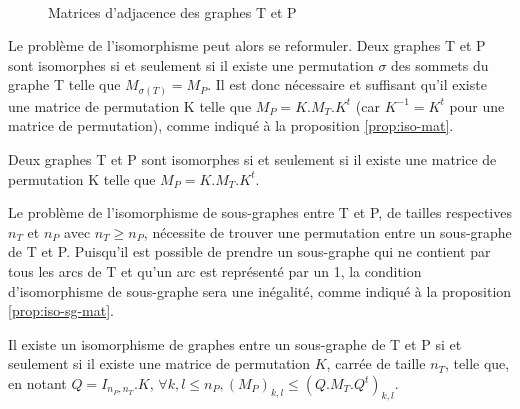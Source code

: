 \begin{figure}[ht]
\begin{center}
  \quad
  \\
\end{center}
\caption{Matrices d'adjacence des graphes T et P}
\label{fig:mat-adj}
\end{figure}

Le problème de l'isomorphisme peut alors se reformuler. Deux graphes T et P sont isomorphes si et seulement si il existe une permutation $\sigma$ des sommets du graphe T telle
que $M_{\sigma(T)}=M_P$. Il est donc nécessaire et suffisant qu'il existe une matrice de permutation K telle que $M_P = K.M_T.K^t$ (car $K^{-1}=K^t$ pour une matrice de permutation), comme indiqué à la proposition \ref{prop:iso-mat}.

\begin{prop}
 Deux graphes T et P sont isomorphes si et seulement si il existe une matrice de permutation K telle que $M_P = K.M_T.K^t$.
 \label{prop:iso-mat}
\end{prop}

Le problème de l'isomorphisme de sous-graphes entre T et P, de tailles respectives $n_T$ et $n_P$ avec $n_T\geq n_P$, nécessite de trouver une permutation entre un sous-graphe de T et P.
Puisqu'il est possible de prendre un sous-graphe qui ne contient par tous les arcs de T et qu'un arc est représenté par un 1, la condition d'isomorphisme de sous-graphe sera une inégalité, comme indiqué à la proposition \ref{prop:iso-sg-mat}.

\begin{prop}
Il existe un isomorphisme de graphes entre un sous-graphe de T et P si et seulement si il existe une matrice de permutation $K$, carrée de taille $n_T$, telle que, en notant $Q=I_{n_P, n_T}.K$, $\forall k,l\leq n_P, (M_P)_{k,l}\leq (Q.M_T.Q^t)_{k,l}$.
\label{prop:iso-sg-mat}
\end{prop}

